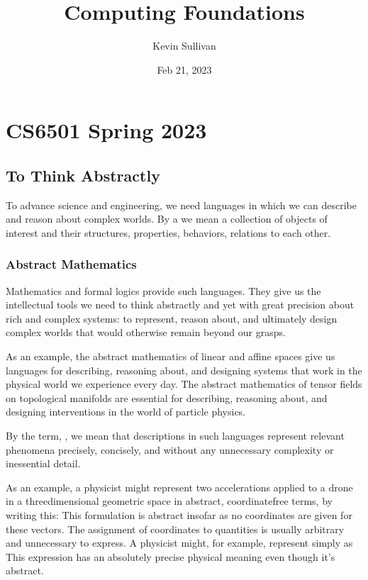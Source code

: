 \documentclass[letterpaper,10pt,english]{sphinxmanual}
\title{Computing Foundations}
\date{Feb 21, 2023}
\author{Kevin Sullivan}
\begin{document}
\pagestyle{empty}
\sphinxmaketitle
\pagestyle{plain}
\sphinxtableofcontents
\pagestyle{normal}
\label{\detokenize{index::doc}}


\sphinxstepscope


\chapter{CS6501 Spring 2023}
\label{\detokenize{A_00_Introduction:cs6501-spring-2023}}\label{\detokenize{A_00_Introduction:introduction}}\label{\detokenize{A_00_Introduction::doc}}

\section{To Think Abstractly}
\label{\detokenize{A_00_Introduction:to-think-abstractly}}
\sphinxAtStartPar
To advance science and engineering, we need languages in
which we can describe and reason about complex worlds. By
a  we mean a collection of objects of interest and
their structures, properties, behaviors, relations to each
other.


\subsection{Abstract Mathematics}
\label{\detokenize{A_00_Introduction:abstract-mathematics}}
\sphinxAtStartPar
Mathematics and formal logics provide such languages. They
give us the intellectual tools we need to think abstractly
and yet with great precision about rich and complex systems:
to represent, reason about, and ultimately design complex
worlds that would otherwise remain beyond our grasps.

\sphinxAtStartPar
As an example, the abstract mathematics of linear and affine
spaces give us languages for describing, reasoning about, and
designing systems that work in the  physical world
we experience every day. The abstract mathematics of tensor
fields on topological manifolds are essential for describing,
reasoning about, and designing interventions in the 
world of particle physics.

\sphinxAtStartPar
By the term, , we mean that descriptions in such
languages represent relevant phenomena precisely, concisely,
and without any unnecessary complexity or inessential detail.

\sphinxAtStartPar
As an example, a physicist might represent two accelerations
applied to a drone in a three\sphinxhyphen{}dimensional geometric space in
abstract, coordinate\sphinxhyphen{}free terms, by writing this:  This formulation is abstract
insofar as no coordinates are given for these vectors. The
assignment of coordinates to  quantities is usually
arbitrary and unnecessary to express. A physicist might, for
example, represent  simply as
 This expression has an absolutely precise physical
meaning even though it’s abstract.
\end{document}
